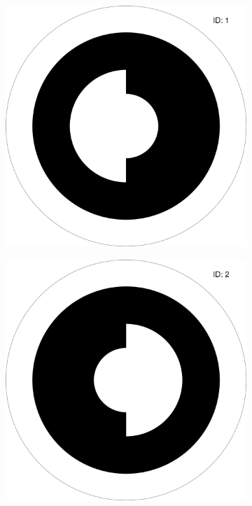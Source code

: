 \begin{figure}[ht]
    \begin{subfigure}[b]{0.23\textwidth}
        \centering
        \includegraphics[width=\textwidth]{images/00000001.png}
        \label{subfig:whycode_1}
    \end{subfigure}
    \begin{subfigure}[b]{0.23\textwidth}
        \centering
        \includegraphics[width=\textwidth]{images/00000002.png}

\end{subfigure}
\end{figure}
